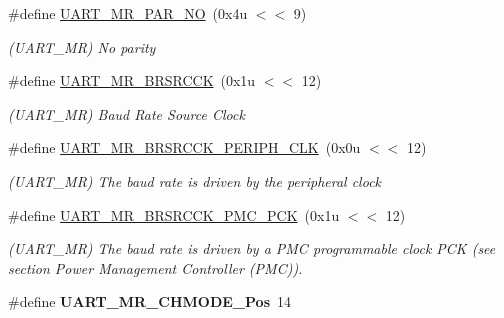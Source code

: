 \begin{DoxyCompactItemize}
\#define \mbox{\hyperlink{group__SAMV71__UART_gaf355d1f016ec0085bc24f4ad2b31bd30}{U\+A\+R\+T\+\_\+\+M\+R\+\_\+\+P\+A\+R\+\_\+\+NO}}~(0x4u $<$$<$ 9)
\begin{DoxyCompactList}\small\item\em (U\+A\+R\+T\+\_\+\+MR) No parity \end{DoxyCompactList}\item 
\mbox{\label{group__SAMV71__UART_gade244123e6a00af0a11e85f17bef8fe5}} 
\#define \mbox{\hyperlink{group__SAMV71__UART_gade244123e6a00af0a11e85f17bef8fe5}{U\+A\+R\+T\+\_\+\+M\+R\+\_\+\+B\+R\+S\+R\+C\+CK}}~(0x1u $<$$<$ 12)
\begin{DoxyCompactList}\small\item\em (U\+A\+R\+T\+\_\+\+MR) Baud Rate Source Clock \end{DoxyCompactList}\item 
\mbox{\label{group__SAMV71__UART_ga0025905c99e51c449ce67a4c670e9aad}} 
\#define \mbox{\hyperlink{group__SAMV71__UART_ga0025905c99e51c449ce67a4c670e9aad}{U\+A\+R\+T\+\_\+\+M\+R\+\_\+\+B\+R\+S\+R\+C\+C\+K\+\_\+\+P\+E\+R\+I\+P\+H\+\_\+\+C\+LK}}~(0x0u $<$$<$ 12)
\begin{DoxyCompactList}\small\item\em (U\+A\+R\+T\+\_\+\+MR) The baud rate is driven by the peripheral clock \end{DoxyCompactList}\item 
\mbox{\label{group__SAMV71__UART_gacb650203506640645a5b957f3bc92316}} 
\#define \mbox{\hyperlink{group__SAMV71__UART_gacb650203506640645a5b957f3bc92316}{U\+A\+R\+T\+\_\+\+M\+R\+\_\+\+B\+R\+S\+R\+C\+C\+K\+\_\+\+P\+M\+C\+\_\+\+P\+CK}}~(0x1u $<$$<$ 12)
\begin{DoxyCompactList}\small\item\em (U\+A\+R\+T\+\_\+\+MR) The baud rate is driven by a P\+MC programmable clock P\+CK (see section Power Management Controller (P\+MC)). \end{DoxyCompactList}\item 
\mbox{\label{group__SAMV71__UART_gadbe17e107662fa9f0d34d964911eb4bb}} 
\#define {\bfseries U\+A\+R\+T\+\_\+\+M\+R\+\_\+\+C\+H\+M\+O\+D\+E\+\_\+\+Pos}~14
\item 
\mbox{\label{group__SAMV71__UART_gaae4c24ca9b88ad0fcc45c6525705d23c}} 

\end{DoxyCompactItemize}
